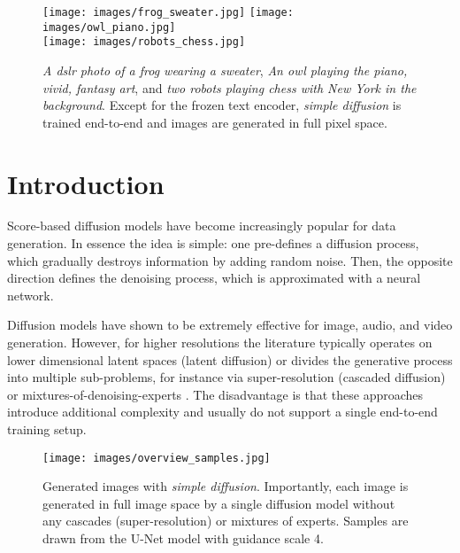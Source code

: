 \documentclass[nohyperref]{article}
\theoremstyle{plain}
\theoremstyle{definition}
\theoremstyle{remark}
\begin{document}
\begin{figure}
    \centering
    \texttt{[image: images/frog\_sweater.jpg]} \hspace{.01\textwidth}
    \texttt{[image: images/owl\_piano.jpg]} \\
    \vspace{.24cm}
    \texttt{[image: images/robots\_chess.jpg]}
    \caption{\textit{A dslr photo of a frog wearing a sweater}, \textit{An owl playing the piano, vivid, fantasy art}, and \textit{two robots playing chess with New York in the background}. Except for the frozen text encoder, \textit{simple diffusion} is trained end-to-end and images are generated in full pixel space.}
    \label{fig:frog_sweater}
\end{figure}

\section{Introduction}
Score-based diffusion models have become increasingly popular for data generation. In essence the idea is simple: one pre-defines a diffusion process, which gradually destroys information by adding random noise. Then, the opposite direction defines the denoising process, which is approximated with a neural network.

Diffusion models have shown to be extremely effective for image, audio, and video generation. However, for higher resolutions the literature typically operates on lower dimensional latent spaces (latent diffusion) \citep{rombach2022highresolution} or divides the generative process into multiple sub-problems, for instance via super-resolution (cascaded diffusion) \citep{ho2022cascaded} or mixtures-of-denoising-experts \citep{balaji2022ediffi}. The disadvantage is that these approaches introduce additional complexity and usually do not support a single end-to-end training setup.

\begin{figure*}[]
    \centering
    \texttt{[image: images/overview\_samples.jpg]}\vspace{-.2cm}
    \caption{Generated images with \textit{simple diffusion}. Importantly, each image is generated in full image space by a single diffusion model without any cascades (super-resolution) or mixtures of experts. Samples are drawn from the U-Net model with guidance scale 4.}
    \label{fig:overview}
\end{figure*}
\end{document}
